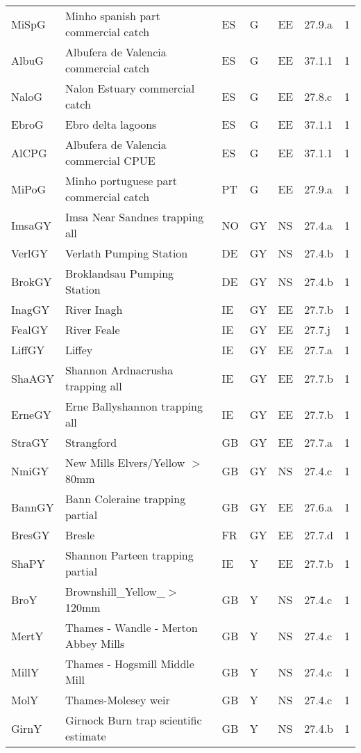 \begin{table}[htbp]
\begin{tabularx}{\textwidth}{p{1.3cm}p{6.5cm}p{1cm}p{1cm}p{1cm}p{1cm}p{1.4cm}}
  MiSpG & Minho spanish part commercial catch & ES & G & EE & 27.9.a &   1 \\ 
  AlbuG & Albufera de Valencia commercial catch & ES & G & EE & 37.1.1 &   1 \\ 
  NaloG & Nalon Estuary commercial catch & ES & G & EE & 27.8.c &   1 \\ 
  EbroG & Ebro delta lagoons & ES & G & EE & 37.1.1 &   1 \\ 
  AlCPG & Albufera de Valencia commercial CPUE & ES & G & EE & 37.1.1 &   1 \\ 
  MiPoG & Minho portuguese part commercial catch & PT & G & EE & 27.9.a &   1 \\ 
  ImsaGY & Imsa Near Sandnes trapping all & NO & GY & NS & 27.4.a &   1 \\ 
  VerlGY & Verlath Pumping Station & DE & GY & NS & 27.4.b &   1 \\ 
  BrokGY & Broklandsau Pumping Station & DE & GY & NS & 27.4.b &   1 \\ 
  InagGY & River Inagh & IE & GY & EE & 27.7.b &   1 \\ 
  FealGY & River Feale & IE & GY & EE & 27.7.j &   1 \\ 
  LiffGY & Liffey & IE & GY & EE & 27.7.a &   1 \\ 
  ShaAGY & Shannon Ardnacrusha trapping all & IE & GY & EE & 27.7.b &   1 \\ 
  ErneGY & Erne Ballyshannon trapping all & IE & GY & EE & 27.7.b &   1 \\ 
  StraGY & Strangford & GB & GY & EE & 27.7.a &   1 \\ 
  NmiGY & New Mills Elvers/Yellow $>$80mm & GB & GY & NS & 27.4.c &   1 \\ 
  BannGY & Bann Coleraine trapping partial & GB & GY & EE & 27.6.a &   1 \\ 
  BresGY & Bresle & FR & GY & EE & 27.7.d &   1 \\ 
  ShaPY & Shannon Parteen trapping partial & IE & Y & EE & 27.7.b &   1 \\ 
  BroY & Brownshill\_Yellow\_$>$120mm & GB & Y & NS & 27.4.c &   1 \\ 
  MertY & Thames - Wandle - Merton Abbey Mills & GB & Y & NS & 27.4.c &   1 \\ 
  MillY & Thames - Hogsmill  Middle Mill & GB & Y & NS & 27.4.c &   1 \\ 
  MolY & Thames-Molesey weir & GB & Y & NS & 27.4.c &   1 \\ 
  GirnY & Girnock Burn trap scientific estimate & GB & Y & NS & 27.4.b &   1 \\ 
   \hline
\end{tabularx}
\end{table}
